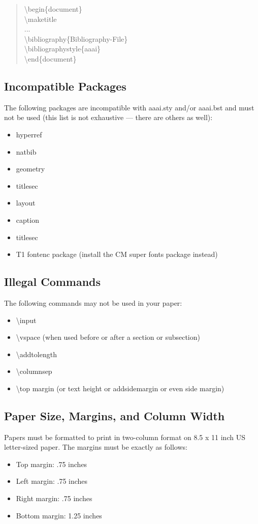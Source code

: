 \documentclass[letterpaper]{article}
\begin{document}
	\begin{quote}
		\begin{small}
			\textbackslash begin\{document\}\\
			\textbackslash maketitle\\
			...\\
			\textbackslash bibliography\{Bibliography-File\}\\
			\textbackslash bibliographystyle\{aaai\}\\
			\textbackslash end\{document\}\\
		\end{small}
	\end{quote}
	\subsection{Incompatible Packages}
	The following packages are incompatible with aaai.sty and/or aaai.bst and must not be used (this list is not exhaustive --- there are others as well):
	\begin{itemize}
		\item hyperref
		\item natbib
		\item geometry
		\item titlesec
		\item layout
		\item caption
		\item titlesec
		\item T1 fontenc package (install the CM super fonts package instead)
	\end{itemize}
	
	\subsection{Illegal Commands}
	The following commands may not be used in your paper:
	\begin{itemize}
		\item \textbackslash input
		\item \textbackslash vspace (when used before or after a section or subsection)
		\item \textbackslash addtolength 
		\item \textbackslash columnsep
		\item \textbackslash top margin (or text height or addsidemargin or even side margin)
	\end{itemize}
	
	\subsection{Paper Size, Margins, and Column Width}
	Papers must be formatted to print in two-column format on 8.5 x 11 inch US letter-sized paper. The margins must be exactly as follows: 
	\begin{itemize}
		\item Top margin: .75 inches
		\item Left margin: .75 inches
		\item Right margin: .75 inches
		\item Bottom margin: 1.25 inches
	\end{itemize} 
	
\end{document}
